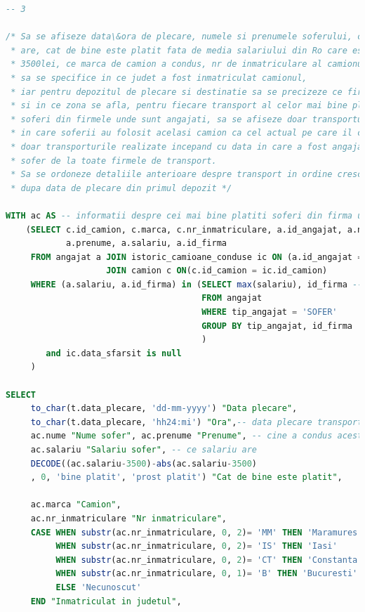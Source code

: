 \documentclass[12pt, a4paper]{article}
\begin{document}
\begin{lstlisting}[language=SQL]
-- 3

/* Sa se afiseze data\&ora de plecare, numele si prenumele soferului, ce salariu
 * are, cat de bine este platit fata de media salariului din Ro care este de
 * 3500lei, ce marca de camion a condus, nr de inmatriculare al camionului,
 * sa se specifice in ce judet a fost inmatriculat camionul,
 * iar pentru depozitul de plecare si destinatie sa se precizeze ce firma le detine
 * si in ce zona se afla, pentru fiecare transport al celor mai bine platiti
 * soferi din firmele unde sunt angajati, sa se afiseze doar transporturile
 * in care soferii au folosit acelasi camion ca cel actual pe care il conduc si
 * doar transporturile realizate incepand cu data in care a fost angajat ultimul
 * sofer de la toate firmele de transport.
 * Sa se ordoneze detaliile anterioare despre transport in ordine crescatoare
 * dupa data de plecare din primul depozit */

WITH ac AS -- informatii despre cei mai bine platiti soferi din firma unde sunt angajati si camionul curent
    (SELECT c.id_camion, c.marca, c.nr_inmatriculare, a.id_angajat, a.nume,
            a.prenume, a.salariu, a.id_firma
     FROM angajat a JOIN istoric_camioane_conduse ic ON (a.id_angajat = ic.id_angajat)
                    JOIN camion c ON(c.id_camion = ic.id_camion)
     WHERE (a.salariu, a.id_firma) in (SELECT max(salariu), id_firma -- obtine salariul mare din firma
                                       FROM angajat
                                       WHERE tip_angajat = 'SOFER'
                                       GROUP BY tip_angajat, id_firma
                                       )
        and ic.data_sfarsit is null
     )

SELECT
     to_char(t.data_plecare, 'dd-mm-yyyy') "Data plecare",
     to_char(t.data_plecare, 'hh24:mi') "Ora",-- data plecare transport
     ac.nume "Nume sofer", ac.prenume "Prenume", -- cine a condus acest transport
     ac.salariu "Salariu sofer", -- ce salariu are
     DECODE((ac.salariu-3500)-abs(ac.salariu-3500)
     , 0, 'bine platit', 'prost platit') "Cat de bine este platit",

     ac.marca "Camion",
     ac.nr_inmatriculare "Nr inmatriculare",
     CASE WHEN substr(ac.nr_inmatriculare, 0, 2)= 'MM' THEN 'Maramures'
          WHEN substr(ac.nr_inmatriculare, 0, 2)= 'IS' THEN 'Iasi'
          WHEN substr(ac.nr_inmatriculare, 0, 2)= 'CT' THEN 'Constanta'
          WHEN substr(ac.nr_inmatriculare, 0, 1)= 'B' THEN 'Bucuresti'
          ELSE 'Necunoscut'
     END "Inmatriculat in judetul",


\end{lstlisting}
\end{document}
